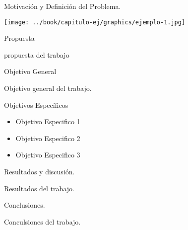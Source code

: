 \begin{frame}[t]{Motivación y Definición del Problema.}
  \begin{center}
    \texttt{[image: ../book/capitulo-ej/graphics/ejemplo-1.jpg]}
  \end{center}
\end{frame}



\begin{frame}[c]{Propuesta}
    \begin{center}
    propuesta del trabajo
    \end{center}
\end{frame}


\begin{frame}[c]{Objetivo General}
    \begin{center}
    Objetivo general del trabajo.
    \end{center}
\end{frame}


\begin{frame}[t]{Objetivos Específicos}
    \begin{center}
        \begin{itemize}
        \item Objetivo Especifico 1
        \item Objetivo Especifico 2
        \item Objetivo Especifico 3
        \end{itemize}
    \end{center}
\end{frame}

\begin{frame}[t]{Resultados y discusión.}
    \begin{center}
        Resultados del trabajo.
    \end{center}
\end{frame}

\begin{frame}[t]{Conclusiones.}
    \begin{center}
        Conculsiones del trabajo.
    \end{center}
\end{frame}


